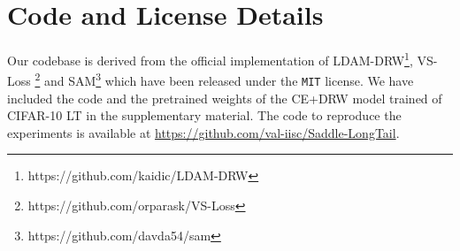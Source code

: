 \documentclass{article}
\begin{document}
\section{Code and License Details}
Our codebase is derived from the official implementation of LDAM-DRW\cite{cao2019learning}\footnote{https://github.com/kaidic/LDAM-DRW}, VS-Loss \cite{kini2021label}\footnote{https://github.com/orparask/VS-Loss} and SAM\cite{foret2021sharpnessaware}\footnote{https://github.com/davda54/sam} which have been released under the \texttt{MIT} license. We have included the code and the pretrained weights of the CE+DRW model trained of CIFAR-10 LT in the supplementary material. The code to reproduce the experiments is available at \href{https://github.com/val-iisc/Saddle-LongTail}{https://github.com/val-iisc/Saddle-LongTail}.


\end{document}
